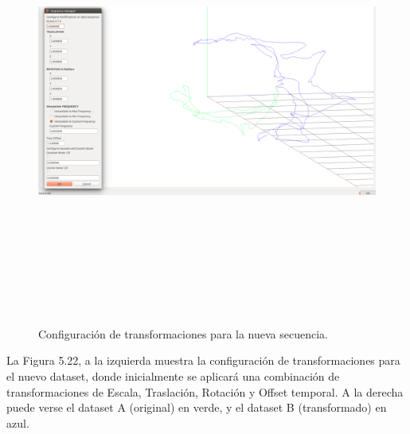 \begin{figure}[H]
\begin{center}
\label{fig:opciones de View}\includegraphics[height=14.0cm,width=18.0cm]{img/cap6/newData_Transformations.png}
\hspace{0.5cm}

\end{center}

\caption{ Configuración de transformaciones para la nueva secuencia.}
\end{figure}
La Figura 5.22, a la izquierda muestra la configuración de transformaciones para el nuevo dataset, donde inicialmente se aplicará una combinación de transformaciones de Escala, Traslación, Rotación y Offset temporal. A la derecha puede verse el dataset A (original) en verde, y el dataset B (transformado) en azul.

